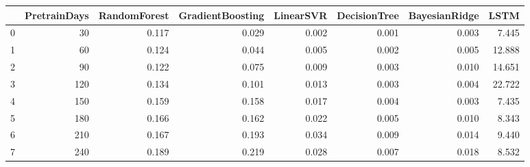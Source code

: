 \begin{tabular}{lrrrrrrr}
\toprule
{} &  PretrainDays &  RandomForest &  GradientBoosting &  LinearSVR &  DecisionTree &  BayesianRidge &   LSTM \\
\midrule
0 &            30 &         0.117 &             0.029 &      0.002 &         0.001 &          0.003 &  7.445 \\
1 &            60 &         0.124 &             0.044 &      0.005 &         0.002 &          0.005 & 12.888 \\
2 &            90 &         0.122 &             0.075 &      0.009 &         0.003 &          0.010 & 14.651 \\
3 &           120 &         0.134 &             0.101 &      0.013 &         0.003 &          0.004 & 22.722 \\
4 &           150 &         0.159 &             0.158 &      0.017 &         0.004 &          0.003 &  7.435 \\
5 &           180 &         0.166 &             0.162 &      0.022 &         0.005 &          0.010 &  8.343 \\
6 &           210 &         0.167 &             0.193 &      0.034 &         0.009 &          0.014 &  9.440 \\
7 &           240 &         0.189 &             0.219 &      0.028 &         0.007 &          0.018 &  8.532 \\
\bottomrule
\end{tabular}
